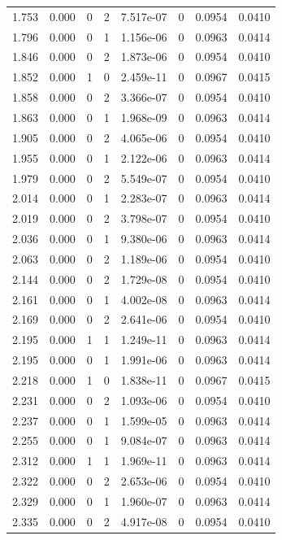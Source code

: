 \documentclass[preview]{standalone}
\begin{document}
{{{\begin{tabular}{L{1.2cm}C{1.2cm} C{0.3cm}C{0.5cm} C{1.4cm}C{1.4cm} C{1.4cm}C{1.4cm}}
  1.753  &  0.000  & 0     &  2 &  7.517e-07  & 0  & 0.0954 &  0.0410   \\ 
  1.796  &  0.000  & 0     &  1 &  1.156e-06  & 0  & 0.0963 &  0.0414   \\ 
  1.846  &  0.000  & 0     &  2 &  1.873e-06  & 0  & 0.0954 &  0.0410   \\ 
  1.852  &  0.000  & 1     &  0 &  2.459e-11  & 0  & 0.0967 &  0.0415   \\ 
  1.858  &  0.000  & 0     &  2 &  3.366e-07  & 0  & 0.0954 &  0.0410   \\ 
  1.863  &  0.000  & 0     &  1 &  1.968e-09  & 0  & 0.0963 &  0.0414   \\ 
  1.905  &  0.000  & 0     &  2 &  4.065e-06  & 0  & 0.0954 &  0.0410   \\ 
  1.955  &  0.000  & 0     &  1 &  2.122e-06  & 0  & 0.0963 &  0.0414   \\ 
  1.979  &  0.000  & 0     &  2 &  5.549e-07  & 0  & 0.0954 &  0.0410   \\ 
  2.014  &  0.000  & 0     &  1 &  2.283e-07  & 0  & 0.0963 &  0.0414   \\ 
  2.019  &  0.000  & 0     &  2 &  3.798e-07  & 0  & 0.0954 &  0.0410   \\ 
  2.036  &  0.000  & 0     &  1 &  9.380e-06  & 0  & 0.0963 &  0.0414   \\ 
  2.063  &  0.000  & 0     &  2 &  1.189e-06  & 0  & 0.0954 &  0.0410   \\ 
  2.144  &  0.000  & 0     &  2 &  1.729e-08  & 0  & 0.0954 &  0.0410   \\ 
  2.161  &  0.000  & 0     &  1 &  4.002e-08  & 0  & 0.0963 &  0.0414   \\ 
  2.169  &  0.000  & 0     &  2 &  2.641e-06  & 0  & 0.0954 &  0.0410   \\ 
  2.195  &  0.000  & 1     &  1 &  1.249e-11  & 0  & 0.0963 &  0.0414   \\ 
  2.195  &  0.000  & 0     &  1 &  1.991e-06  & 0  & 0.0963 &  0.0414   \\ 
  2.218  &  0.000  & 1     &  0 &  1.838e-11  & 0  & 0.0967 &  0.0415   \\ 
  2.231  &  0.000  & 0     &  2 &  1.093e-06  & 0  & 0.0954 &  0.0410   \\ 
  2.237  &  0.000  & 0     &  1 &  1.599e-05  & 0  & 0.0963 &  0.0414   \\ 
  2.255  &  0.000  & 0     &  1 &  9.084e-07  & 0  & 0.0963 &  0.0414   \\ 
  2.312  &  0.000  & 1     &  1 &  1.969e-11  & 0  & 0.0963 &  0.0414   \\ 
  2.322  &  0.000  & 0     &  2 &  2.653e-06  & 0  & 0.0954 &  0.0410   \\ 
  2.329  &  0.000  & 0     &  1 &  1.960e-07  & 0  & 0.0963 &  0.0414   \\ 
  2.335  &  0.000  & 0     &  2 &  4.917e-08  & 0  & 0.0954 &  0.0410   \\ 
\hline 
\end{tabular} 

}}}
\end{document}
